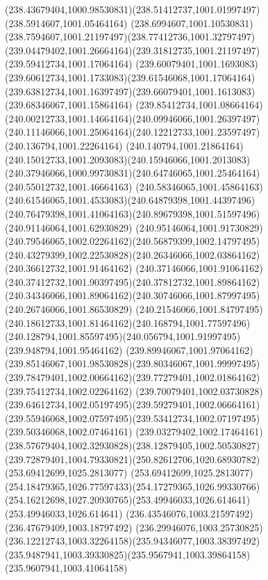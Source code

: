 {{		\curveto(238.43679404,1000.98530831)(238.51412737,1001.01997497)(238.5914607,1001.05464164)
		\curveto(238.6994607,1001.10530831)(238.7594607,1001.21197497)(238.77412736,1001.32797497)
		\curveto(239.04479402,1001.26664164)(239.31812735,1001.21197497)(239.59412734,1001.17064164)
		\curveto(239.60079401,1001.1693083)(239.60612734,1001.1733083)(239.61546068,1001.17064164)
		\curveto(239.63812734,1001.16397497)(239.66079401,1001.1613083)(239.68346067,1001.15864164)
		\curveto(239.85412734,1001.08664164)(240.00212733,1001.14664164)(240.09946066,1001.26397497)
		\curveto(240.11146066,1001.25064164)(240.12212733,1001.23597497)(240.136794,1001.22264164)
		\curveto(240.140794,1001.21864164)(240.15012733,1001.2093083)(240.15946066,1001.2013083)
		\curveto(240.37946066,1000.99730831)(240.64746065,1001.25464164)(240.55012732,1001.46664163)
		\curveto(240.58346065,1001.45864163)(240.61546065,1001.4533083)(240.64879398,1001.44397496)
		\curveto(240.76479398,1001.41064163)(240.89679398,1001.51597496)(240.91146064,1001.62930829)
		\curveto(240.95146064,1001.91730829)(240.79546065,1002.02264162)(240.56879399,1002.14797495)
		\curveto(240.43279399,1002.22530828)(240.26346066,1002.03864162)(240.36612732,1001.91464162)
		\curveto(240.37146066,1001.91064162)(240.37412732,1001.90397495)(240.37812732,1001.89864162)
		\curveto(240.34346066,1001.89064162)(240.30746066,1001.87997495)(240.26746066,1001.86530829)
		\curveto(240.21546066,1001.84797495)(240.18612733,1001.81464162)(240.168794,1001.77597496)
		\curveto(240.128794,1001.85597495)(240.056794,1001.91997495)(239.948794,1001.95464162)
		\curveto(239.89946067,1001.97064162)(239.85146067,1001.98530828)(239.80346067,1001.99997495)
		\curveto(239.78479401,1002.00664162)(239.77279401,1002.01864162)(239.75412734,1002.02264162)
		\curveto(239.70079401,1002.03730828)(239.64612734,1002.05197495)(239.59279401,1002.06664161)
		\curveto(239.55946068,1002.07597495)(239.53412734,1002.07197495)(239.50346068,1002.07464161)
		\curveto(239.03279402,1002.17464161)(238.57679404,1002.32930828)(238.12879405,1002.50530827)
		\curveto(239.72879401,1004.79330821)(250.82612706,1020.68930782)(253.69412699,1025.2813077)
		\curveto(253.69412699,1025.2813077)(254.18479365,1026.77597433)(254.17279365,1026.99330766)
		\curveto(254.16212698,1027.20930765)(253.49946033,1026.614641)(253.49946033,1026.614641)
		\lineto(236.43546076,1003.21597492)
		\lineto(236.47679409,1003.18797492)
		\curveto(236.29946076,1003.25730825)(236.12212743,1003.32264158)(235.94346077,1003.38397492)
		\curveto(235.9487941,1003.39330825)(235.9567941,1003.39864158)(235.9607941,1003.41064158)
}}
